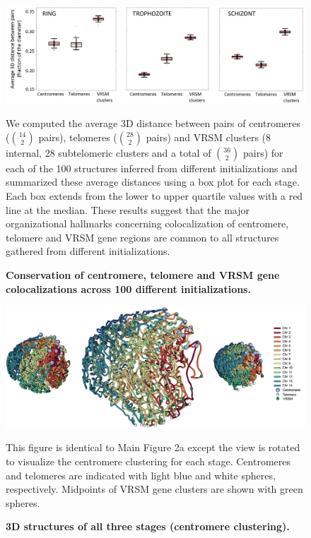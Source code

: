\begin{figure}
  \begin{center}
  \includegraphics[width=1\textwidth]{suppFigs/stabilityOf3Dinference/allStages-clustering.png}
  \end{center}
\caption{{\bf Conservation of centromere, telomere and VRSM gene colocalizations across 100 different initializations. }}
{ We computed the average 3D distance between pairs of centromeres (${14 \choose 2}$ pairs),
telomeres (${28 \choose 2}$ pairs) and VRSM clusters (8 internal, 28 subtelomeric clusters and a total of ${36 \choose 2}$ pairs)
for each of the 100 structures inferred from different initializations and summarized
these average distances using a box plot for each stage. Each box extends from the
lower to upper quartile values with a red line at the median.  These results suggest that
the major organizational hallmarks concerning colocalization of centromere, telomere and
VRSM gene regions are common to all structures gathered from different initializations.}
\label{suppfig:clusteringIn100Structures}
\end{figure}
\clearpage




\begin{figure}
  \begin{center}
  \includegraphics[width=1\textwidth]{suppFigs/3Dall/all3D-centromeres-angle-lowRes.png}
   \end{center}
\caption{{\bf 3D structures of all three stages (centromere clustering).}}
{This figure is identical to Main Figure 2a except the view is rotated to visualize the centromere
clustering for each stage. Centromeres and telomeres are indicated with light blue and white spheres,
respectively. Midpoints of VRSM gene clusters are shown with green spheres.}
\label{suppfig:3Dcentromeres}
\end{figure}
\clearpage


